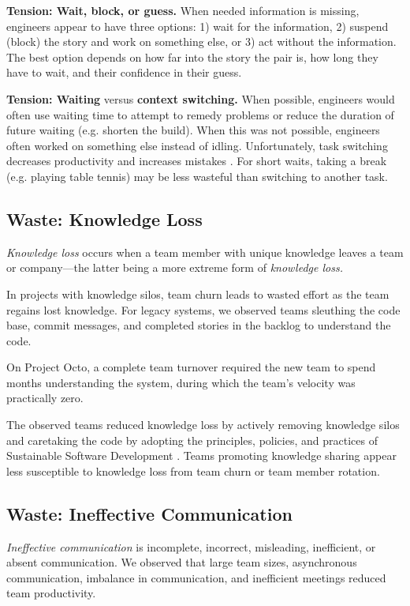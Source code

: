 \textbf{Tension: Wait, block, or guess.}
When needed information is missing, engineers appear to have three options: 1) wait for the information, 2) suspend (block) the story and work on something else, or 3) act without the information. The best option depends on how far into the story the pair is, how long they have to wait, and their confidence in their guess.

\textbf{Tension: Waiting} versus \textbf{context switching.}
When possible, engineers would often use waiting time to attempt to remedy problems or reduce the duration of future waiting (e.g. shorten the build). When this was not possible, engineers often worked on something else instead of idling. Unfortunately, task switching decreases productivity and increases mistakes \cite{MonsellTaskSwitching}. For short waits, taking a break (e.g. playing table tennis) may be less wasteful than switching to another task. 

\subsection{Waste: Knowledge Loss}
\textit{Knowledge loss} occurs when a team member with unique knowledge leaves a team or company---the latter being a more extreme form of \textit{knowledge loss.}

In projects with knowledge silos, team churn leads to wasted effort as the team regains lost knowledge. For legacy systems, we observed teams sleuthing the code base, commit messages, and completed stories in the backlog to understand the code.  

On Project Octo, a complete team turnover required the new team to spend months understanding the system, during which the team's velocity was practically zero.

The observed teams reduced knowledge loss by actively removing knowledge silos and caretaking the code by adopting the principles, policies, and practices of Sustainable Software Development \cite{SedanoSustainableSoftware}. Teams promoting knowledge sharing appear less susceptible to knowledge loss from team churn or team member rotation. 

\subsection{Waste: Ineffective Communication}
\textit{Ineffective communication} is incomplete, incorrect, misleading, inefficient, or absent communication. We observed that large team sizes, asynchronous communication, imbalance in communication, and inefficient meetings reduced team productivity.

